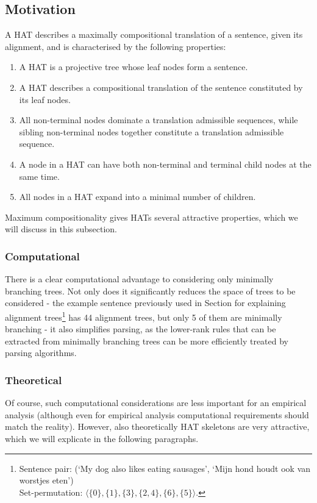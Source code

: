 \documentclass{report}
\begin{document}
\subsection{Motivation}

A HAT describes a maximally compositional translation of a sentence, given its alignment, and is characterised by the following properties:\begin{enumerate}
\item A HAT is a projective tree whose leaf nodes form a sentence.
\item A HAT describes a compositional translation of the sentence constituted by its leaf nodes.
\item All non-terminal nodes dominate a translation admissible sequences, while sibling non-terminal nodes together constitute a translation admissible sequence.
\item A node in a HAT can have both non-terminal and terminal child nodes at the same time.
\item All nodes in a HAT expand into a minimal number of children.
\end{enumerate}

\noindent Maximum compositionality gives HATs several attractive properties, which we will discuss in this subsection.

\subsubsection{Computational}
There is a clear computational advantage to considering only minimally branching trees. Not only does it significantly reduces the space of trees to be considered - the example sentence previously used in Section \label{sec:comp_structures} for explaining alignment trees\footnote{Sentence pair: (`My dog also likes eating sausages', `Mijn hond houdt ook van worstjes eten')\\Set-permutation: $\langle \{0\}, \{1\}, \{3\}, \{2,4\}, \{6\}, \{5\}\rangle$. } has 44 alignment trees, but only 5 of them are minimally branching - it also simplifies parsing, as the lower-rank rules that can be extracted from minimally branching trees can be more efficiently treated by parsing algorithms.

\subsubsection{Theoretical}

Of course, such computational considerations are less important for an empirical analysis (although even for empirical analysis computational requirements should match the reality). However, also theoretically HAT skeletons are very attractive, which we will explicate in the following paragraphs.
\end{document}
